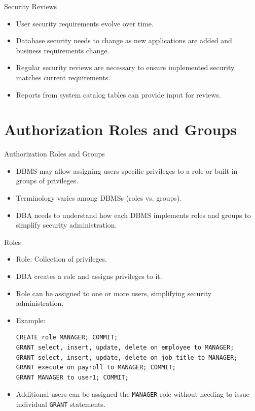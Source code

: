 \documentclass[aspectratio=169]{beamer}
\begin{document}
\begin{frame}{Security Reviews}
    \begin{itemize}
        \item User security requirements evolve over time.
        \item Database security needs to change as new applications are added and business requirements change.
        \item Regular security reviews are necessary to ensure implemented security matches current requirements.
        \item Reports from system catalog tables can provide input for reviews.
    \end{itemize}
\end{frame}

\section{Authorization Roles and Groups}

\begin{frame}{Authorization Roles and Groups}
    \begin{itemize}
        \item DBMS may allow assigning users specific privileges to a role or built-in groups of privileges.
        \item Terminology varies among DBMSs (roles vs. groups).
        \item DBA needs to understand how each DBMS implements roles and groups to simplify security administration.
    \end{itemize}
\end{frame}

\begin{frame}[fragile]{Roles}
    \begin{itemize}
        \item Role: Collection of privileges.
        \item DBA creates a role and assigns privileges to it.
        \item Role can be assigned to one or more users, simplifying security administration.
        \item Example:
            {\scriptsize
                \begin{verbatim}
CREATE role MANAGER; COMMIT;
GRANT select, insert, update, delete on employee to MANAGER;
GRANT select, insert, update, delete on job_title to MANAGER;
GRANT execute on payroll to MANAGER; COMMIT;
GRANT MANAGER to user1; COMMIT;
                \end{verbatim}
            }
        \item Additional users can be assigned the \texttt{MANAGER} role without needing to issue individual \texttt{GRANT} statements.
    \end{itemize}
\end{frame}
\end{document}
